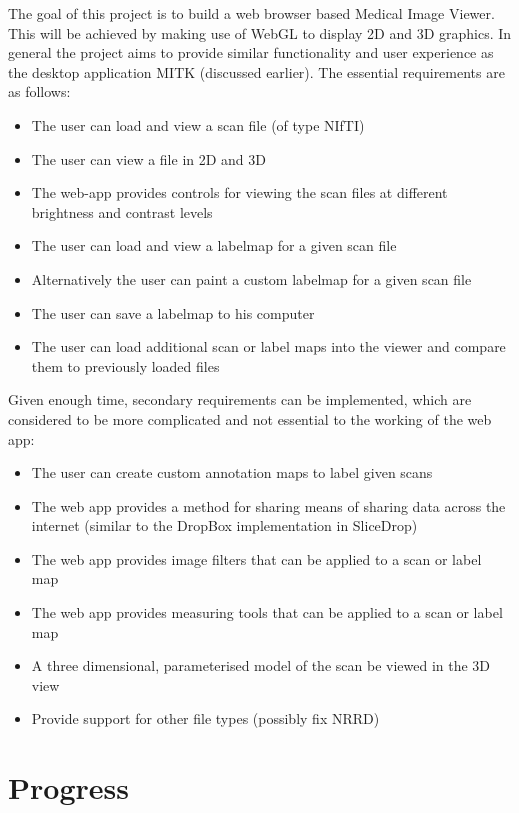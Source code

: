 \documentclass[a4paper,11pt,titlepage]{article}
\begin{document}
The goal of this project is to build a web browser based Medical Image Viewer. This will be achieved by making use of WebGL to display 2D and 3D graphics. In general the project aims to provide similar functionality and user experience as the desktop application MITK (discussed earlier). The essential requirements are as follows:

\begin{itemize}
\item The user can load and view a scan file (of type NIfTI)
\item The user can view a file in 2D and 3D
\item The web-app provides controls for viewing the scan files at different brightness and contrast levels
\item The user can load and view a labelmap for a given scan file
\item Alternatively the user can paint a custom labelmap for a given scan file
\item The user can save a labelmap to his computer
\item The user can load additional scan or label maps into the viewer and compare them to previously loaded files
\end{itemize}

Given enough time, secondary requirements can be implemented, which are considered to be more complicated and not essential to the working of the web app:

\begin{itemize}
\item The user can create custom annotation maps to label given scans
\item The web app provides a method for sharing  means of sharing data across the internet (similar to the DropBox implementation in SliceDrop)
\item The web app provides image filters that can be applied to a scan or label map
\item The web app provides measuring tools that can be applied to a scan or label map
\item A three dimensional, parameterised model of the scan be viewed in the 3D view
\item Provide support for other file types (possibly fix NRRD)
\end{itemize}

\section{Progress}
\end{document}
